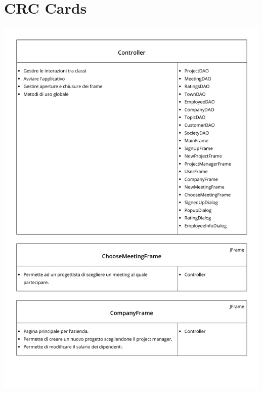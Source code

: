 \documentclass[a4paper,11pt]{report}
\begin{document}
		\section{CRC Cards}
			\includegraphics[page = 1, width = \textwidth]{IMGs/CRC.pdf}
			\newpage
\end{document}

